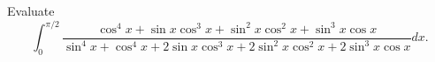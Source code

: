 Evaluate
$$ \int_0^{\pi/2} \dfrac{\cos^4 x + \sin x \cos^3 x + \sin^2 x \cos^2 x + \sin^3 x \cos x}
                        {\sin^4 x + \cos^4 x + 2 \sin x \cos^3 x + 2 \sin^2 x \cos^2 x + 2 \sin^3 x \cos x} dx. $$
